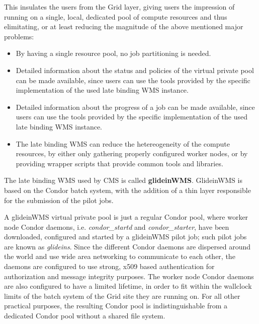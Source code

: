 \documentclass[a4paper]{jpconf}
\begin{document}
This insulates the users from the Grid layer, giving users
the impression of running on a single, local, dedicated pool of compute resources
and thus elimitating, or at least reducing the magnitude of the above mentioned major problems:
\begin {itemize}
\item 
By having a single resource pool, no job partitioning is needed.
\item
Detailed information about the status and policies of the virtual private pool can be made available, 
since users can use the tools provided by the specific implementation of the used late binding WMS instance.
\item 
Detailed information about the progress of a job can be made available,
since users can use the tools provided by the specific implementation of the used late binding WMS instance.
\item
The late binding WMS can reduce the hetereogeneity of the compute resources, 
by either only gathering properly configured worker nodes,
or by providing wrapper scripts that provide common tools and libraries.
\end{itemize}

The late binding WMS used by CMS is called \textbf{glideinWMS}. GlideinWMS is based on the Condor batch system, 
with the addition of a thin layer responsible for the submission of the pilot jobs.

A glideinWMS virtual private pool is just a regular Condor pool, 
where worker node Condor daemons, i.e. \emph{condor_startd} and \emph{condor_starter}, 
have been downloaded, configured and started by a glideinWMS pilot job; such pilot jobs are known as \emph{glideins}. 
Since the different Condor daemons are dispersed around the world and use wide area networking to communicate to each other,
the daemons are configured to use strong, x509 based authentication for authorization and message integrity purposes.
The worker node Condor daemons are also configured to have a limited lifetime, in order to fit within the wallclock limits 
of the batch system of the Grid site they are running on.
For all other practical purposes, the resulting Condor pool is indistinguishable from a dedicated Condor pool without a shared file system.
\end{document}
